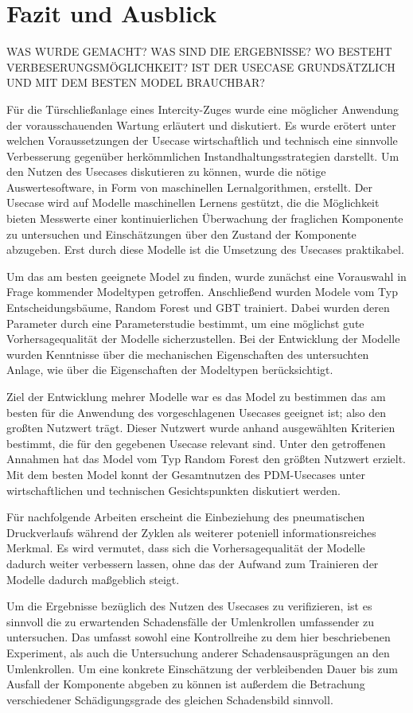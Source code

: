 \chapter{Fazit und Ausblick}
\label{ch:fazit}
WAS WURDE GEMACHT? WAS SIND DIE ERGEBNISSE? WO BESTEHT VERBESERUNGSMÖGLICHKEIT? 
IST DER USECASE GRUNDSÄTZLICH UND MIT DEM BESTEN MODEL BRAUCHBAR?

Für die Türschließanlage eines Intercity-Zuges wurde eine möglicher Anwendung der vorausschauenden Wartung erläutert und diskutiert. Es wurde erötert unter welchen Voraussetzungen der Usecase wirtschaftlich und technisch eine sinnvolle Verbesserung gegenüber herkömmlichen Instandhaltungsstrategien darstellt. Um den Nutzen des Usecases diskutieren zu können, wurde die nötige Auswertesoftware, in Form von maschinellen Lernalgorithmen, erstellt. Der Usecase wird auf Modelle maschinellen Lernens gestützt, die die Möglichkeit bieten Messwerte einer kontinuierlichen Überwachung der fraglichen Komponente zu untersuchen und Einschätzungen über den Zustand der Komponente abzugeben. Erst durch diese Modelle ist die Umsetzung des Usecases praktikabel. 

Um das am besten geeignete Model zu finden, wurde zunächst eine Vorauswahl in Frage kommender Modeltypen getroffen. Anschließend wurden Modele vom Typ Entscheidungsbäume, Random Forest und GBT trainiert. Dabei wurden deren Parameter durch eine Parameterstudie bestimmt, um eine möglichst gute Vorhersagequalität der Modelle sicherzustellen. Bei der Entwicklung der Modelle wurden Kenntnisse über die mechanischen Eigenschaften des untersuchten Anlage, wie über die Eigenschaften der Modeltypen berücksichtigt.

Ziel der Entwicklung mehrer Modelle war es das Model zu bestimmen das am besten für die Anwendung des vorgeschlagenen Usecases geeignet ist; also den großten Nutzwert trägt. Dieser Nutzwert wurde anhand ausgewählten Kriterien bestimmt, die für den gegebenen Usecase relevant sind. Unter den getroffenen Annahmen hat das Model vom Typ Random Forest den größten Nutzwert erzielt. Mit dem besten Model konnt der Gesamtnutzen des PDM-Usecases unter wirtschaftlichen und technischen Gesichtspunkten diskutiert werden.

Für nachfolgende Arbeiten erscheint die Einbeziehung des pneumatischen Druckverlaufs während der Zyklen als weiterer poteniell informationsreiches Merkmal. Es wird vermutet, dass sich die Vorhersagequalität der Modelle dadurch weiter verbessern lassen, ohne das der Aufwand zum Trainieren der Modelle dadurch maßgeblich steigt. 

Um die Ergebnisse bezüglich des Nutzen des Usecases zu verifizieren, ist es sinnvoll die zu erwartenden Schadensfälle der Umlenkrollen umfassender zu untersuchen. Das umfasst sowohl eine Kontrollreihe zu dem hier beschriebenen Experiment, als auch die Untersuchung anderer Schadensausprägungen an den Umlenkrollen. Um eine konkrete Einschätzung der verbleibenden Dauer bis zum Ausfall der Komponente abgeben zu können ist außerdem die Betrachung verschiedener Schädigungsgrade des gleichen Schadensbild sinnvoll. 